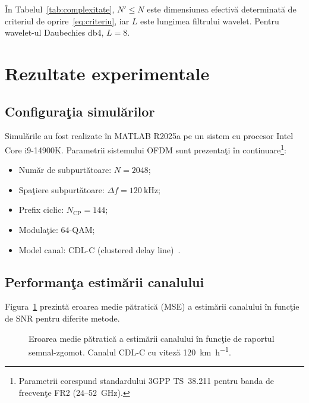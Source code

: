 \documentclass[12pt,a4paper]{article}
\begin{document}
În Tabelul~\ref{tab:complexitate}, $N' \leq N$ este dimensiunea efectivă
determinată de criteriul de oprire~\eqref{eq:criteriu}, iar $L$ este
lungimea filtrului wavelet. Pentru wavelet-ul Daubechies db4, $L = 8$.

\section{Rezultate experimentale}
\label{sec:rezultate}

\subsection{Configuraţia simulărilor}

Simulările au fost realizate în MATLAB R2025a pe un sistem cu
procesor Intel Core i9-14900K. Parametrii sistemului OFDM sunt
prezentaţi în continuare\footnote{Parametrii corespund standardului
3GPP TS~38.211 pentru banda de frecvenţe FR2 (24--52~GHz).}:
\begin{itemize}
  \item Număr de subpurtătoare: $N = 2048$;
  \item Spaţiere subpurtătoare: $\Delta f = \SI{120}{\kilo\hertz}$;
  \item Prefix ciclic: $N_{\mathrm{CP}} = 144$;
  \item Modulaţie: 64-QAM;
  \item Model canal: CDL-C (clustered delay line)~\citep{3gpp2020}.
\end{itemize}

\subsection{Performanţa estimării canalului}

Figura~\ref{fig:mse} prezintă eroarea medie pătratică (MSE) a estimării
canalului în funcţie de SNR pentru diferite metode.

\begin{figure}[ht]
\centering
{}
\caption{Eroarea medie pătratică a estimării canalului în funcţie de raportul
semnal-zgomot. Canalul CDL-C cu viteză \SI{120}{\kilo\meter\per\hour}.}
\label{fig:mse}
\end{figure}
\end{document}
